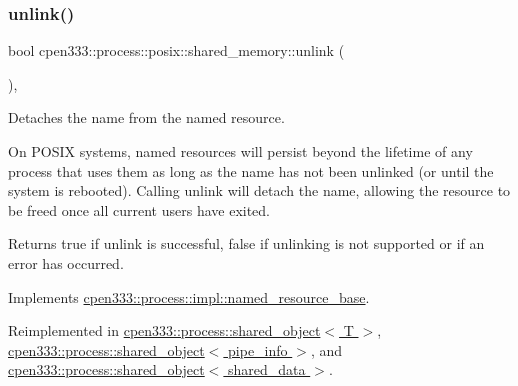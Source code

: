 \subsubsection{\texorpdfstring{unlink()}{unlink()}\hspace{0.1cm}{\footnotesize\ttfamily [1/2]}}
{\footnotesize\ttfamily bool cpen333\+::process\+::posix\+::shared\+\_\+memory\+::unlink (\begin{DoxyParamCaption}{ }\end{DoxyParamCaption})\hspace{0.3cm}{\ttfamily [inline]}, {\ttfamily [virtual]}}



Detaches the name from the named resource. 

On P\+O\+S\+IX systems, named resources will persist beyond the lifetime of any process that uses them as long as the name has not been unlinked (or until the system is rebooted). Calling {\ttfamily unlink} will detach the name, allowing the resource to be freed once all current users have exited.

\begin{DoxyReturn}{Returns}
{\ttfamily true} if unlink is successful, {\ttfamily false} if unlinking is not supported or if an error has occurred. 
\end{DoxyReturn}


Implements \hyperlink{classcpen333_1_1process_1_1impl_1_1named__resource__base_ae4033f82dfd068b917a9bca57d3a0c45}{cpen333\+::process\+::impl\+::named\+\_\+resource\+\_\+base}.



Reimplemented in \hyperlink{classcpen333_1_1process_1_1shared__object_aa5b43829da5bd2376927e6285745211c}{cpen333\+::process\+::shared\+\_\+object$<$ T $>$}, \hyperlink{classcpen333_1_1process_1_1shared__object_aa5b43829da5bd2376927e6285745211c}{cpen333\+::process\+::shared\+\_\+object$<$ pipe\+\_\+info $>$}, and \hyperlink{classcpen333_1_1process_1_1shared__object_aa5b43829da5bd2376927e6285745211c}{cpen333\+::process\+::shared\+\_\+object$<$ shared\+\_\+data $>$}.

\mbox{\label{classcpen333_1_1process_1_1posix_1_1shared__memory_a68a9ecfafed3c939bc9c38edee71d584}} 

